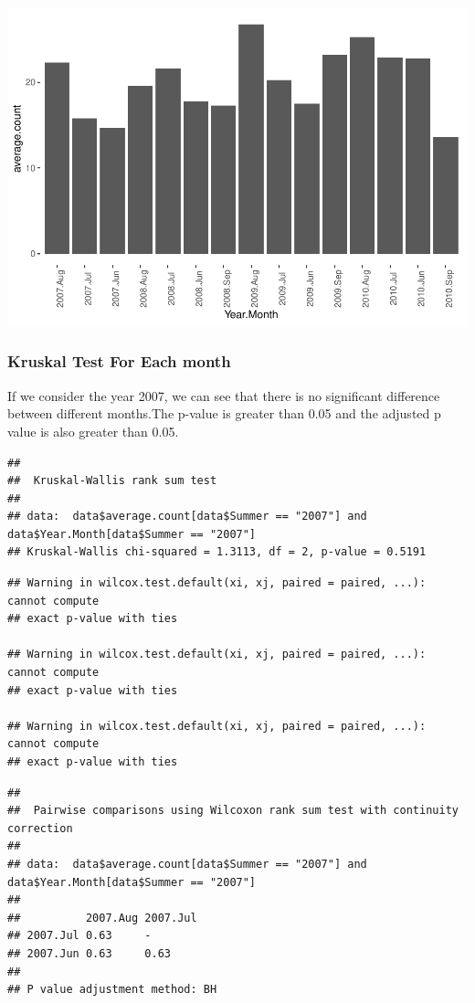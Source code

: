 \documentclass[
]{article}
\begin{document}
\includegraphics{Statistical-analysis-in-RStudio_files/figure-latex/unnamed-chunk-12-1.pdf}

\hypertarget{kruskal-test-for-each-month}{%
\subsubsection{Kruskal Test For Each
month}\label{kruskal-test-for-each-month}}

If we consider the year 2007, we can see that there is no significant
difference between different months.The p-value is greater than 0.05 and
the adjusted p value is also greater than 0.05.

\begin{verbatim}
## 
##  Kruskal-Wallis rank sum test
## 
## data:  data$average.count[data$Summer == "2007"] and data$Year.Month[data$Summer == "2007"]
## Kruskal-Wallis chi-squared = 1.3113, df = 2, p-value = 0.5191
\end{verbatim}

\begin{verbatim}
## Warning in wilcox.test.default(xi, xj, paired = paired, ...): cannot compute
## exact p-value with ties

## Warning in wilcox.test.default(xi, xj, paired = paired, ...): cannot compute
## exact p-value with ties

## Warning in wilcox.test.default(xi, xj, paired = paired, ...): cannot compute
## exact p-value with ties
\end{verbatim}

\begin{verbatim}
## 
##  Pairwise comparisons using Wilcoxon rank sum test with continuity correction 
## 
## data:  data$average.count[data$Summer == "2007"] and data$Year.Month[data$Summer == "2007"] 
## 
##          2007.Aug 2007.Jul
## 2007.Jul 0.63     -       
## 2007.Jun 0.63     0.63    
## 
## P value adjustment method: BH
\end{verbatim}
\end{document}
